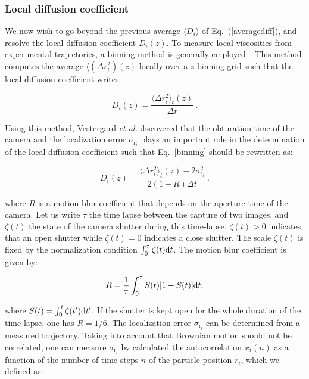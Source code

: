 \subsubsection{Local diffusion coefficient}

We now wish to go beyond the previous average $\langle D_i\rangle$ of Eq.~(\ref{averagediff}), and resolve the local diffusion coefficient $D_i(z)$. To measure local viscosities from experimental trajectories, a binning method is generally employed~\cite{friedrich_approaching_2011}. This method computes the average $\langle ( \Delta r_i^2 ) (z)$ locally over a $z$-binning grid such that the local diffusion coefficient writes:

\begin{equation}
	D_i(z) = \frac{\langle  \Delta r_i^2  \rangle _t (z)}{\Delta t} ~.
	\label{binning}
\end{equation}

Using this method, Vestergard \textit{et al.} \cite{vestergaard_estimation_2015} discovered that the obturation time of the camera and the localization error $\sigma_{\mathrm{r}_i}$ plays an important role in the determination of the local diffusion coefficient such that Eq.~\ref{binning} should be rewritten as:

\begin{equation}
	D_i(z) = \frac{\langle  \Delta r_i^2 \rangle _t (z) - 2 \sigma_{\mathrm{r}_i}^2}{2(1 - R)\Delta t}~.
	\label{binning_vestergaard}
\end{equation}

where $R$ is a motion blur coefficient that depends on the aperture time of the camera. Let us write $\tau$ the time lapse between the capture of two images, and $\zeta(t)$ the state of the camera shutter during this time-lapse. $\zeta(t) > 0$ indicates that an open shutter while  $\zeta(t) = 0$ indicates a close shutter. The scale $\zeta(t)$ is fixed by the normalization condition $\int_{0}^{\tau} \zeta(t)\textnormal{d}t$. The motion blur coefficient is given by:

\begin{equation}
	R = \frac{1}{\tau} \int_{0}^{\tau} S(t)[1 - S(t)] \textnormal{d}t,
\end{equation}

where $S(t) = \int_{0}^{t}\zeta(t') \textnormal{d}t'$. If the shutter is kept open for the whole duration of the time-lapse, one has $R = 1/6$. The localization error $\sigma_{\mathrm{r}_i}$ can be determined from a measured trajectory. Taking into account that Brownian motion should not be correlated, one can measure $\sigma_{\mathrm{r}_i}$ by calculated the autocorrelation $x_i(n)$ as a function of the number of time steps $n$ of the particle position $r_i$, which we defined as:

